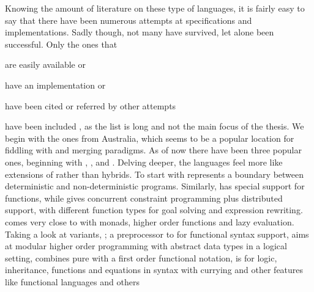 \documentclass[thesis-solanki.tex]{subfiles}
\begin{document}
Knowing the amount of literature  on these type of languages, it is fairly easy to say that there have been numerous 
attempts at specifications and implementations.
Sadly though, not many have survived, let alone been successful.
Only the ones that
\begin{inparaenum}[(a)]
\item
  are easily available or
\item
  have an implementation or
\item
  have been cited or referred by other attempts
\end{inparaenum}
have been included , as the list is long and  not the main focus of the thesis.
We begin
with the ones from Australia, which seems to be a popular location for fiddling with
 and merging paradigms.
As of now there have been three popular ones, beginning with , \cite{website:nue-prolog},
 \cite{website:oz-mozart} and  \cite{website:mercury}.
Delving deeper, the languages feel more like extensions of  rather than hybrids.
To start with  represents a boundary between deterministic and
non-deterministic programs. Similarly,
has special support for functions, while  gives concurrent constraint programming
plus distributed support, with different function types for goal solving and expression rewriting.
 \cite{lloyd1999programming:escher} comes very close to  with monads, higher
order functions and lazy evaluation.
Taking a look at  variants,  \cite{website:ciao}; a preprocessor to
 for functional syntax support,  \cite{website:lambda-prolog} aims at
modular higher order programming with abstract data types in a logical setting, 
\cite{website:babel,moreno1992logic, moreno1988babel} combines pure  with a first order functional
notation,  \cite{website:life} is for  logic, inheritance, functions and equations in
 syntax with currying and other features like functional languages and others
\end{document}
